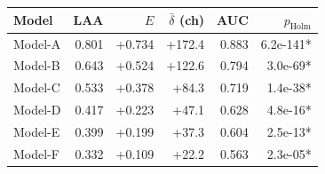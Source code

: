 \begin{tabular}{lrrrrr}
\toprule
Model & LAA & $E$ & $\bar\delta$ (ch) & AUC & $p_{\text{Holm}}$\\
\midrule
Model-A & 0.801 & +0.734 & +172.4 & 0.883 & 6.2e-141*\\
Model-B & 0.643 & +0.524 & +122.6 & 0.794 & 3.0e-69*\\
Model-C & 0.533 & +0.378 & +84.3 & 0.719 & 1.4e-38*\\
Model-D & 0.417 & +0.223 & +47.1 & 0.628 & 4.8e-16*\\
Model-E & 0.399 & +0.199 & +37.3 & 0.604 & 2.5e-13*\\
Model-F & 0.332 & +0.109 & +22.2 & 0.563 & 2.3e-05*\\
\bottomrule
\end{tabular}